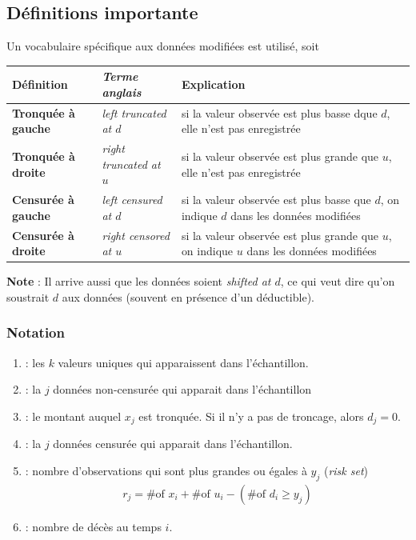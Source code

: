 \documentclass[12pt, french]{report}
\begin{document}
\subsection{Définitions importante}
Un vocabulaire spécifique aux données modifiées est utilisé, soit

\begin{tabular}{|>{\bfseries} l |>{\em}l |p{3cm}|}
\hline
Définition	& Terme anglais & Explication \\
\hline	\hline
Tronquée à gauche	& left truncated at $d$ & si la valeur observée est plus basse dque $d$, elle n'est pas enregistrée \\
Tronquée à droite	& right truncated at $u$ & si la valeur observée est plus grande que $u$, elle n'est pas enregistrée \\
Censurée à gauche & left censured at $d$ & si la valeur observée est plus basse que $d$, on indique $d$ dans les données modifiées \\
Censurée à droite & right censored at $u$ & si la valeur observée est plus grande que $u$, on indique $u$ dans les données modifiées \\
\hline
\end{tabular}

\textbf{Note} : Il arrive aussi que les données soient \emph{shifted at $d$}, ce qui veut dire qu'on soustrait $d$ aux données (souvent en présence d'un déductible). 

\subsubsection{Notation}
\begin{enumerate}[label=\faAngleRight]
\item {} : les $k$ valeurs uniques qui apparaissent dans l'échantillon.

\item {} : la $j$ données non-censurée qui apparait dans l'échantillon

\item {} : le montant auquel $x_j$ est tronquée. Si il n'y a pas de troncage, alors $d_j = 0$.

\item {} : la $j$  données censurée qui apparait dans l'échantillon.

\item {} : nombre d'observations qui sont plus grandes ou égales à $y_j$ (\emph{risk set})
\begin{align*}
r_j = \text{\# of $x_i$} + \text{\# of $u_i$} - (\text{\# of $d_i$} \geq y_j)
\end{align*}

\item {} : nombre de décès au temps $i$.
\end{enumerate}
\end{document}
